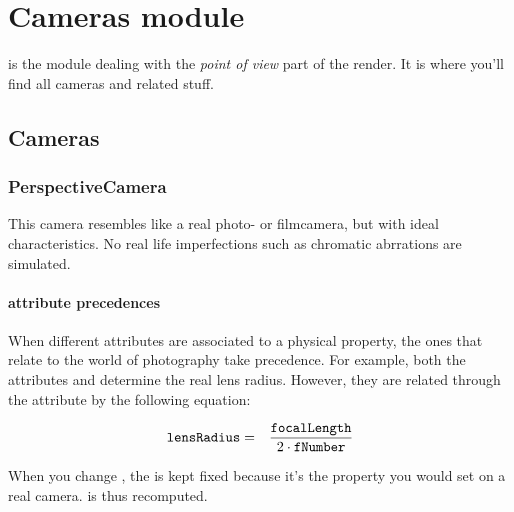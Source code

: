 %

\chapter{Cameras module}

 is the module dealing with the \emph{point of view} part of the render.  It is where you'll find all cameras and related stuff.

\section{Cameras}

\subsection{PerspectiveCamera}\label{cameras.PerspectiveCamera}

This camera resembles like a real photo- or filmcamera, but with ideal characteristics.  No real life imperfections such as chromatic abrrations are simulated.

\subsubsection*{attribute precedences}

When different attributes are associated to a physical property, the ones that relate to the world of photography take precedence.  For example, both the attributes  and  determine the real lens radius.  However, they are related through the  attribute by the following equation:

\begin{eqnarray}
	\kw{lensRadius} &=& \frac{\kw{focalLength}}{2 \cdot \kw{fNumber}}
\end{eqnarray}

When you change , the  is kept fixed because it's the property you would set on a real camera.   is thus recomputed.

